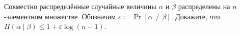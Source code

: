 Совместно распределённые случайные величины $\alpha$ и $\beta$ распределены на $n$-элементном
множестве. Обозначим $\varepsilon \coloneqq \Pr[\alpha \neq \beta]$. Докажите, что $H(\alpha \mid \beta)
\le 1 + \varepsilon \log (n - 1)$.